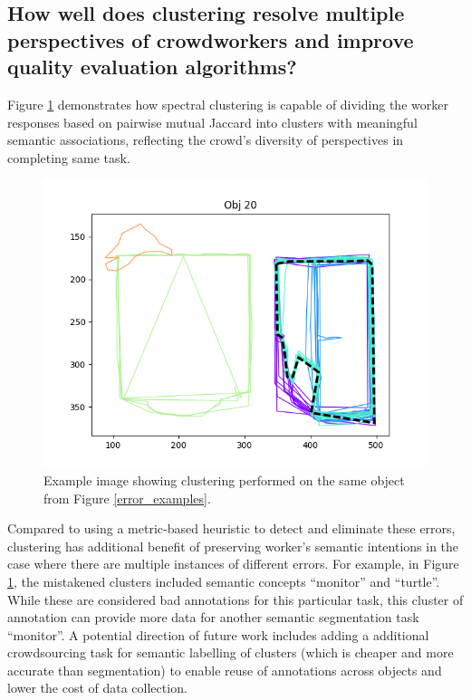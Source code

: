   \subsection{How well does clustering resolve multiple perspectives of crowdworkers and improve quality evaluation algorithms?}
    Figure \ref{cluster_example} demonstrates how spectral clustering is capable of dividing the worker responses based on pairwise mutual Jaccard into clusters with meaningful semantic associations, reflecting the crowd's diversity of perspectives in completing same task.
    \begin{figure}[ht!]
      \centering
      \includegraphics[width=\textwidth]{plots/20.png}
      \caption{Example image showing clustering performed on the same object from Figure \ref{error_examples}.}
      \label{cluster_example}
    \end{figure}
  \par Compared to using a metric-based heuristic to detect and eliminate these errors, clustering has additional benefit of preserving worker's semantic intentions in the case where there are multiple instances of different errors. For example, in Figure \ref{cluster_example}, the mistakened clusters included semantic concepts ``monitor'' and ``turtle''. While these are considered bad annotations for this particular task, this cluster of annotation can provide more data for another semantic segmentation task ``monitor''. A potential direction of future work includes adding a additional crowdsourcing task for semantic labelling of clusters (which is cheaper and more accurate than segmentation) to enable reuse of annotations across objects and lower the cost of data collection. 
